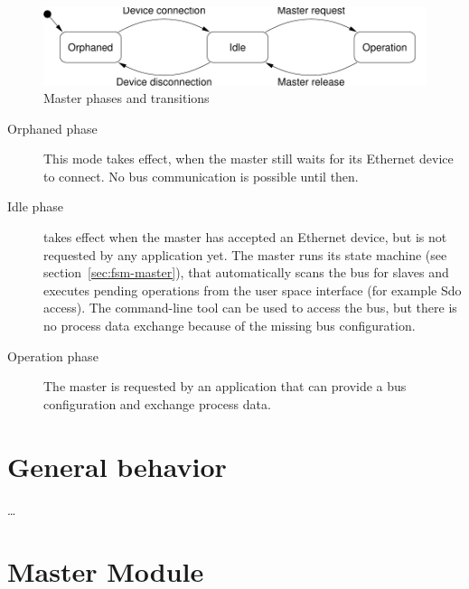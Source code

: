 \documentclass[a4paper,12pt,BCOR6mm,bibtotoc,idxtotoc]{scrbook}
\begin{document}
\begin{figure}[htbp]
  \centering
  \includegraphics[width=.9\textwidth]{images/phases}
  \caption{Master phases and transitions}
  \label{fig:phases}
\end{figure}
\begin{description}

\item[Orphaned phase] This mode takes effect, when the
master still waits for its Ethernet device to connect. No bus communication is
possible until then.

\item[Idle phase] takes effect when the master has accepted
an Ethernet device, but is not requested by any application yet. The master
runs its state machine (see section~\ref{sec:fsm-master}), that automatically
scans the bus for slaves and executes pending operations from the user space
interface (for example Sdo access). The command-line tool can be used to access
the bus, but there is no process data exchange because of the missing bus
configuration.

\item[Operation phase] The master is requested by an
application that can provide a bus configuration and exchange process data.

\end{description}


\section{General behavior} %

\ldots


\section{Master Module}
\label{sec:mastermodule}
\end{document}
